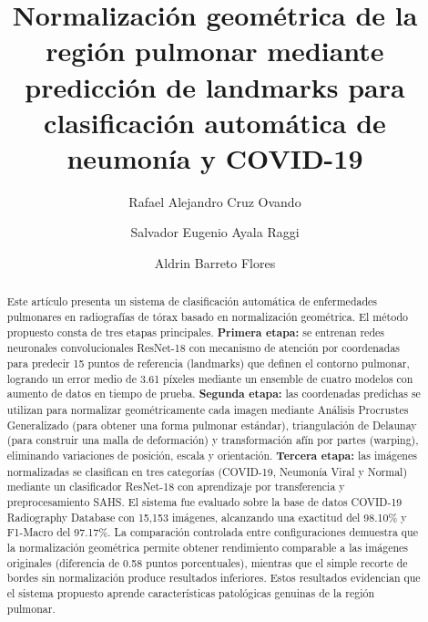 \documentclass[runningheads]{llncs}
\begin{document}
\title{Normalización geométrica de la región pulmonar mediante predicción de landmarks para clasificación automática de neumonía y COVID-19}

\author{Rafael Alejandro Cruz Ovando\and
Salvador Eugenio Ayala Raggi\and
Aldrin Barreto Flores}



\maketitle

\begin{abstract}
Este artículo presenta un sistema de clasificación automática de enfermedades pulmonares en radiografías de tórax basado en normalización geométrica. El método propuesto consta de tres etapas principales. \textbf{Primera etapa:} se entrenan redes neuronales convolucionales ResNet-18 con mecanismo de atención por coordenadas para predecir 15 puntos de referencia (landmarks) que definen el contorno pulmonar, logrando un error medio de 3.61 píxeles mediante un ensemble de cuatro modelos con aumento de datos en tiempo de prueba. \textbf{Segunda etapa:} las coordenadas predichas se utilizan para normalizar geométricamente cada imagen mediante Análisis Procrustes Generalizado (para obtener una forma pulmonar estándar), triangulación de Delaunay (para construir una malla de deformación) y transformación afín por partes (warping), eliminando variaciones de posición, escala y orientación. \textbf{Tercera etapa:} las imágenes normalizadas se clasifican en tres categorías (COVID-19, Neumonía Viral y Normal) mediante un clasificador ResNet-18 con aprendizaje por transferencia y preprocesamiento SAHS. El sistema fue evaluado sobre la base de datos COVID-19 Radiography Database con 15,153 imágenes, alcanzando una exactitud del 98.10\% y F1-Macro del 97.17\%. La comparación controlada entre configuraciones demuestra que la normalización geométrica permite obtener rendimiento comparable a las imágenes originales (diferencia de 0.58 puntos porcentuales), mientras que el simple recorte de bordes sin normalización produce resultados inferiores. Estos resultados evidencian que el sistema propuesto aprende características patológicas genuinas de la región pulmonar.

\end{abstract}
\end{document}
